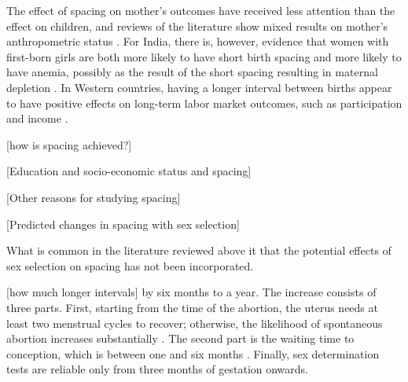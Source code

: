 The effect of spacing on mother's outcomes have received less attention than the
effect on children, and reviews of the literature show mixed results on mother's 
anthropometric status \citep{Dewey2007,Conde-Agudelo2012}.
For India, there is, however, evidence that women with first-born girls are both
more likely to have short birth spacing and more likely to have anemia, possibly as
the result of the short spacing resulting in maternal depletion \citep{Milazzo2018}.
In Western countries, having a longer interval between births appear to have positive
effects on long-term labor market outcomes, such as participation and 
income \citep{Gough2017,Karimi2014}.



[how is spacing achieved?]
\citep{Rahman1993}
\citep{Jayachandran2011}
\citep{Alam2018}


[Education and socio-economic status and spacing]






[Other reasons for studying spacing]


[Predicted changes in spacing with sex selection]

What is common in the literature reviewed above it that the potential effects of 
sex selection on spacing has not been incorporated.

[how much longer intervals]
 by six months to a year.
The increase consists of three parts.
First, starting from the time of the abortion, the uterus needs at 
least two menstrual cycles to recover;  otherwise, the likelihood 
of spontaneous abortion increases substantially \citep{zhou00b}.
The second part is the waiting time to conception, which is between 
one and six months \citep{Wang2003}.
Finally, sex determination tests are reliable only from three months 
of gestation onwards.

 
